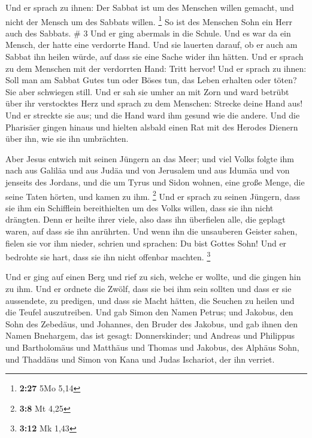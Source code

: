  Und er sprach zu ihnen: Der Sabbat ist um des Menschen
willen gemacht, und nicht der Mensch um des Sabbats willen. \footnote{\textbf{2:27}
  5Mo 5,14}  So ist des Menschen Sohn ein Herr auch des
Sabbats. \# 3  Und er ging abermals in die Schule. Und es
war da ein Mensch, der hatte eine verdorrte Hand.  Und sie
lauerten darauf, ob er auch am Sabbat ihn heilen würde, auf dass sie
eine Sache wider ihn hätten.  Und er sprach zu dem Menschen
mit der verdorrten Hand: Tritt hervor!  Und er sprach zu
ihnen: Soll man am Sabbat Gutes tun oder Böses tun, das Leben erhalten
oder töten? Sie aber schwiegen still.  Und er sah sie umher
an mit Zorn und ward betrübt über ihr verstocktes Herz und sprach zu dem
Menschen: Strecke deine Hand aus! Und er streckte sie aus; und die Hand
ward ihm gesund wie die andere.  Und die Pharisäer gingen
hinaus und hielten alsbald einen Rat mit des Herodes Dienern über ihn,
wie sie ihn umbrächten.

 Aber Jesus entwich mit seinen Jüngern an das Meer; und viel
Volks folgte ihm nach aus Galiläa und aus Judäa  und von
Jerusalem und aus Idumäa und von jenseits des Jordans, und die um Tyrus
und Sidon wohnen, eine große Menge, die seine Taten hörten, und kamen zu
ihm. \footnote{\textbf{3:8} Mt 4,25}  Und er sprach zu
seinen Jüngern, dass sie ihm ein Schifflein bereithielten um des Volks
willen, dass sie ihn nicht drängten.  Denn er heilte ihrer
viele, also dass ihn überfielen alle, die geplagt waren, auf dass sie
ihn anrührten.  Und wenn ihn die unsauberen Geister sahen,
fielen sie vor ihm nieder, schrien und sprachen: Du bist Gottes Sohn!
 Und er bedrohte sie hart, dass sie ihn nicht offenbar
machten. \footnote{\textbf{3:12} Mk 1,43}

 Und er ging auf einen Berg und rief zu sich, welche er
wollte, und die gingen hin zu ihm.  Und er ordnete die
Zwölf, dass sie bei ihm sein sollten und dass er sie aussendete, zu
predigen,  und dass sie Macht hätten, die Seuchen zu heilen
und die Teufel auszutreiben.  Und gab Simon den Namen
Petrus;  und Jakobus, den Sohn des Zebedäus, und Johannes,
den Bruder des Jakobus, und gab ihnen den Namen Bnehargem, das ist
gesagt: Donnerskinder;  und Andreas und Philippus und
Bartholomäus und Matthäus und Thomas und Jakobus, des Alphäus Sohn, und
Thaddäus und Simon von Kana  und Judas Ischariot, der ihn
verriet.

